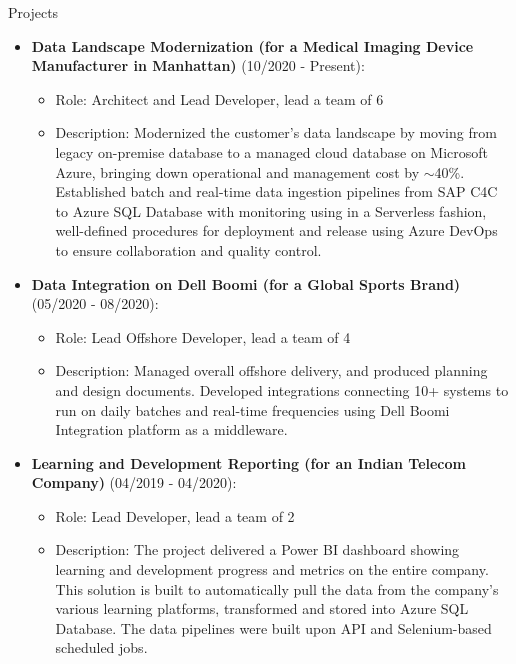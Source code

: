\documentclass{resume} %
\begin{document}
\begin{rSection}{Projects}
		\begin{itemize}
			\item \textbf{Data Landscape Modernization (for a Medical Imaging Device Manufacturer in Manhattan)} (10/2020 - Present):
			\begin{itemize}
				\item Role: Architect and Lead Developer, lead a team of 6
				\item Description: Modernized the customer's data landscape by moving from legacy on-premise database to a managed cloud database on Microsoft Azure, bringing down operational and management cost by $\sim$40\%. Established batch and real-time data ingestion pipelines from SAP C4C to Azure SQL Database with monitoring using in a Serverless fashion, well-defined procedures for deployment and release using Azure DevOps to ensure collaboration and quality control.
			\end{itemize}
		\end{itemize}
		
		\begin{itemize}
			\item \textbf{Data Integration on Dell Boomi (for a Global Sports Brand)} (05/2020 - 08/2020):
			\begin{itemize}
				\item Role: Lead Offshore Developer, lead a team of 4
				\item Description: Managed overall offshore delivery, and produced planning and design documents. Developed integrations connecting 10+ systems to run on daily batches and real-time frequencies using Dell Boomi Integration platform as a middleware.
			\end{itemize}
		\end{itemize}
		
		\begin{itemize}
			\item \textbf{Learning and Development Reporting (for an Indian Telecom Company)} (04/2019 - 04/2020):
			\begin{itemize}
				\item Role: Lead Developer, lead a team of 2
				\item Description: The project delivered a Power BI dashboard showing learning and development progress and metrics on the entire company. This solution is built to automatically pull the data from the company's various learning platforms, transformed and stored into Azure SQL Database. The data pipelines were built upon API and Selenium-based scheduled jobs.
			\end{itemize}
		\end{itemize}
		
	\end{rSection}
	
\end{document}
